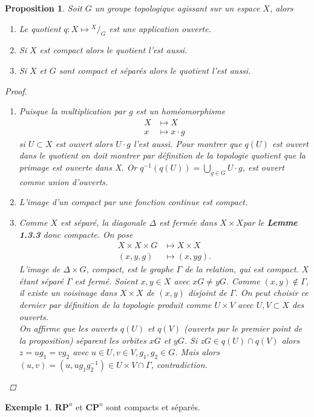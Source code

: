 \documentclass[12pt]{book}
\newtheorem{prop}[lemma]{Proposition}
\theoremstyle{definition}
\newtheorem{example}[lemma]{Exemple}
\theoremstyle{remark}
\newcommand*\quot[2]{{^{\textstyle #1}\big/_{\textstyle #2}}}
\begin{document}
	\begin{prop}
		Soit $G$ un groupe topologique agissant sur un espace $X$, alors
		\begin{enumerate}
			\item Le quotient $q : X \longmapsto \quot{X}{G}$ est une application ouverte.
			\item Si $X$ est compact alors le quotient l'est aussi.
			\item Si $X$ et $G$ sont compact et séparés alors le quotient l'est aussi.
		\end{enumerate}
		\begin{proof}
			\begin{enumerate}
				\item Puisque la multiplication par $g$ est un homéomorphisme 
					 \begin{align*}
						 X &\longmapsto X \\
						 x &\longmapsto x\cdot g
					\end{align*}
					si $U \subset X$ est ouvert alors $U \cdot g$ l'est aussi. Pour montrer que $q(U)$ est ouvert dans le quotient on doit montrer par définition de la topologie quotient que la primage est ouverte dans X. Or  $q^{-1}(q(U)) = \bigcup_{g\in G}U\cdot g$, est ouvert comme union d'ouverts.
				\item L'image d'un compact par une fonction continue est compact.
				\item Comme $X$ est séparé, la diagonale $\Delta$ est fermée dans $X \times X$par le \textbf{Lemme 1.3.3} donc compacte. On pose
					\begin{align*}
						X \times X \times G &\longmapsto X \times X \\
						(x,y,g) &\longmapsto (x,yg)
					.\end{align*}
					L'image de $\Delta \times G$, compact, est le graphe $\Gamma$ de la relation, qui est compact. X étant séparé $\Gamma$ est fermé. Soient  $x,y \in X$ avec $xG \neq yG$. Comme  $(x,y) \not\in \Gamma$, il existe un voisinage dans $X\times X$ de $(x,y)$ disjoint de  $\Gamma$. On peut choisir ce dernier par définition de la topologie produit comme $U\times V$ avec $U,V \subset X$ des ouverts.  \\
					On affirme que les ouverts $q(U)$ et  $q(V)$ (ouverts par le premier point de la proposition) séparent les orbites  $xG$ et $yG$. Si  $zG \in q(U)\cap q(V)$ alors $z = ug_1 = vg_2$ avec $u\in U,v \in V, g_1,g_2\in G$. Mais alors $(u,v) = (u,ug_1g^{-1}_2) \in U\times V \cap \Gamma$, contradiction.
			\end{enumerate}
		\end{proof}
	\end{prop}
	\begin{example}
		$\mathbf{RP}^n$ et $\mathbf{CP}^n$ sont compacts et séparés.
	\end{example}
\end{document}
